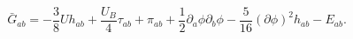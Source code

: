 \begin{equation}
\bar G_{ab}= -\frac{3}{8}Uh_{ab}+\frac{U_B}{4}\tau_{ab}+\pi_{ab}+\frac{1}{2}
\partial_a \phi \partial_b\phi -\frac{5}{16}(\partial\phi)^2 h_{ab}-E_{ab}.
\end{equation}

